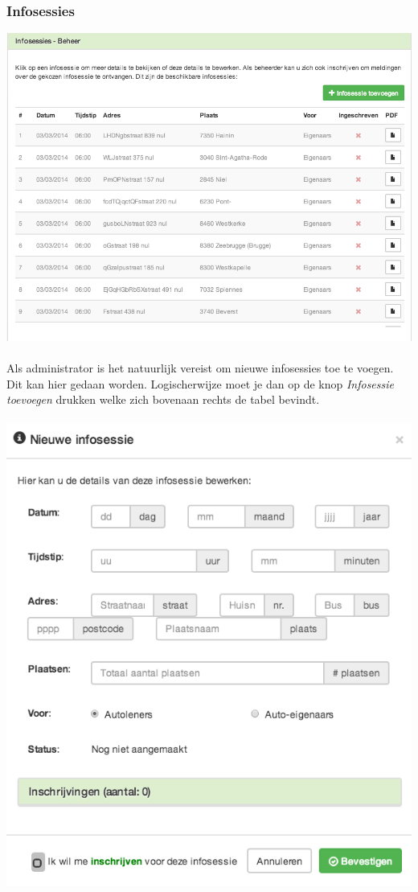 \documentclass[11pt,a4paper,oneside]{article}
\begin{document}
\subsubsection{Infosessies}
\includegraphics[scale=0.75]{img/infosessiesbeheer} \\\\
Als administrator is het natuurlijk vereist om nieuwe infosessies toe te voegen. Dit kan hier gedaan worden. Logischerwijze moet je dan op de knop \textit{Infosessie toevoegen} drukken welke zich bovenaan rechts de tabel bevindt. \\\\
\includegraphics[scale=0.75]{img/nieuweinfosessie} \\\\
\end{document}

